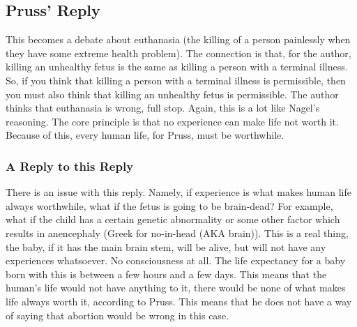 \subsection{Pruss' Reply}

This becomes a debate about euthanasia (the killing of a person painlessly when they have some extreme health problem). The connection is that, for the author, killing an unhealthy fetus is the same as killing a person with a terminal illness. So, if you think that killing a person with a terminal illness is permissible, then you must also think that killing an unhealthy fetus is permissible. The author thinks that euthanasia is wrong, full stop. Again, this is a lot like Nagel's reasoning. The core principle is that no experience can make life not worth it. Because of this, every human life, for Pruss, must be worthwhile. 
\subsubsection{A Reply to this Reply}

There is an issue with this reply. Namely, if experience is what makes human life always worthwhile, what if the fetus is going to be brain-dead? For example, what if the child has a certain genetic abnormality or some other factor which results in anencephaly (Greek for no-in-head (AKA brain)). This is a real thing, the baby, if it has the main brain stem, will be alive, but will not have any experiences whatsoever. No consciousness at all. The life expectancy for a baby born with this is between a few hours and a few days. This means that the human's life would not have anything to it, there would be none of what makes life always worth it, according to Pruss. This means that he does not have a way of saying that abortion would be wrong in this case. 
